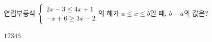 연립부등식 $\begin{cases} 2x-3\le 4x+1 \\ -x+6\ge 3x-2 \end{cases}$의 해가 $a\le x\le b$일 때, $b-a$의 값은?
\begin{choices32}{$1$}{$2$}{$3$}{$4$}{$5$}\end{choices32}
